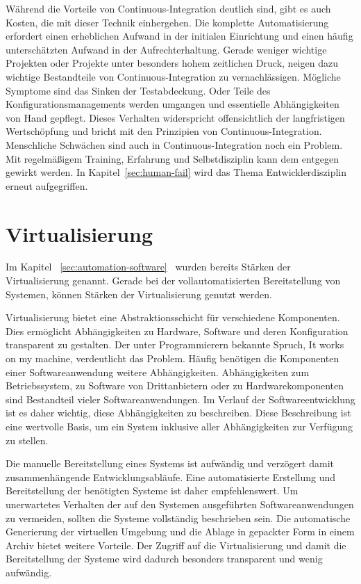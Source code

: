 Während die Vorteile von Continuous-Integration deutlich sind, gibt es auch Kosten, die mit dieser Technik einhergehen. Die komplette Automatisierung erfordert einen erheblichen Aufwand in der initialen Einrichtung und einen häufig unterschätzten Aufwand in der Aufrechterhaltung. 
Gerade weniger wichtige Projekten oder Projekte unter besonders hohem zeitlichen Druck, neigen dazu wichtige Bestandteile von Continuous-Integration zu vernachlässigen. Mögliche Symptome sind das Sinken der Testabdeckung. Oder Teile des Konfigurationsmanagements werden umgangen und essentielle Abhängigkeiten von Hand gepflegt. Dieses Verhalten widerspricht offensichtlich der langfristigen Wertschöpfung und bricht mit den Prinzipien von Continuous-Integration. Menschliche Schwächen sind auch in Continuous-Integration noch ein Problem. Mit regelmäßigem 
Training, Erfahrung und Selbstdisziplin kann dem entgegen gewirkt werden. In Kapitel~\ref{sec:human-fail} wird das Thema Entwicklerdisziplin erneut aufgegriffen.

\section{Virtualisierung}

Im Kapitel ~\ref{sec:automation-software}~ wurden bereits Stärken der Virtualisierung genannt. Gerade bei der vollautomatisierten Bereitstellung von Systemen, können Stärken der Virtualisierung genutzt werden.

Virtualisierung bietet eine Abstraktionsschicht für verschiedene Komponenten. Dies ermöglicht Abhängigkeiten zu Hardware, Software und deren Konfiguration transparent zu gestalten. Der unter Programmierern bekannte Spruch, \glqq It works on my machine\grqq{}, verdeutlicht das Problem. Häufig benötigen die Komponenten einer Softwareanwendung weitere Abhängigkeiten. Abhängigkeiten zum Betriebssystem, zu Software von Drittanbietern oder zu Hardwarekomponenten sind Bestandteil
vieler Softwareanwendungen. Im Verlauf der Softwareentwicklung ist es daher wichtig, diese Abhängigkeiten zu beschreiben. Diese Beschreibung ist eine wertvolle Basis, um ein System inklusive aller Abhängigkeiten zur Verfügung zu stellen.

Die manuelle Bereitstellung eines Systems ist aufwändig und verzögert damit zusammenhängende Entwicklungsabläufe. Eine automatisierte Erstellung und Bereitstellung der benötigten Systeme ist daher empfehlenswert. Um unerwartetes Verhalten 
der auf den Systemen ausgeführten Softwareanwendungen zu vermeiden, sollten die Systeme vollständig beschrieben sein. Die automatische Generierung der virtuellen Umgebung und die Ablage in gepackter Form in einem Archiv bietet weitere Vorteile. Der Zugriff auf die Virtualisierung und damit die Bereitstellung der Systeme wird dadurch besonders transparent 
und wenig aufwändig.

